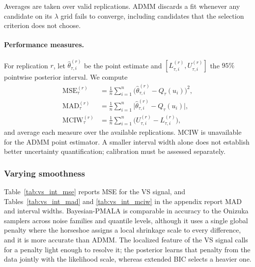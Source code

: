 Averages are taken over valid replications. ADMM discards a fit whenever any candidate on its $\lambda$ grid fails to converge, including candidates that the selection criterion does not choose.

\paragraph{Performance measures.} For replication $r$, let $\widehat{\theta}_{\tau,i}^{(r)}$ be the point estimate and $[L_{\tau,i}^{(r)},U_{\tau,i}^{(r)}]$ the $95\%$ pointwise posterior interval. We compute
\begin{align*}
 \mathrm{MSE}^{(r)}_\tau&=\frac{1}{n}\sum_{i=1}^n
  \bigl(\widehat{\theta}_{\tau,i}^{(r)}-Q_\tau(u_i)\bigr)^2,\\
 \mathrm{MAD}^{(r)}_\tau&=\frac{1}{n}\sum_{i=1}^n
  \bigl|\widehat{\theta}_{\tau,i}^{(r)}-Q_\tau(u_i)\bigr|,\\
 \mathrm{MCIW}^{(r)}_\tau&=\frac{1}{n}\sum_{i=1}^n
  \bigl(U_{\tau,i}^{(r)}-L_{\tau,i}^{(r)}\bigr),
\end{align*}
and average each measure over the available replications. MCIW is unavailable for the ADMM point estimator. A smaller interval width alone does not establish better uncertainty quantification; calibration must be assessed separately.

\subsubsection{Varying smoothness}
\label{sec:sim:ind:vs}

Table~\ref{tab:vs_int_mse} reports MSE for the VS signal, and Tables~\ref{tab:vs_int_mad} and \ref{tab:vs_int_mciw} in the appendix report MAD and interval widths. Bayesian-PMALA is comparable in accuracy to the Onizuka samplers across noise families and quantile levels, although it uses a single global penalty where the horseshoe assigns a local shrinkage scale to every difference, and it is more accurate than ADMM. The localized feature of the VS signal calls for a penalty light enough to resolve it; the posterior learns that penalty from the data jointly with the likelihood scale, whereas extended BIC selects a heavier one.

